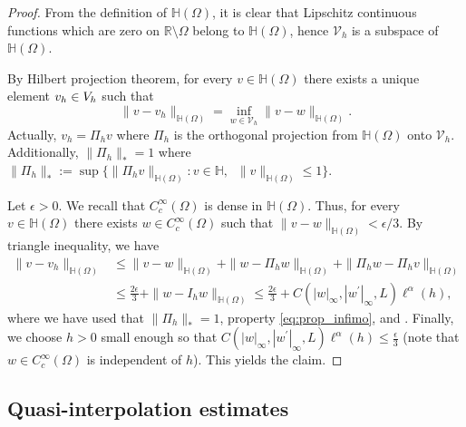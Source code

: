 \documentclass[11 pt]{article}
\numberwithin{equation}{section}
\def\R{\mathbb{R}}
\begin{document}
\begin{proof}
%
From the definition of $\mathbb H(\Omega)$, it is clear that Lipschitz continuous functions which are zero on $\R\setminus \Omega$ belong to $\mathbb H(\Omega)$, hence $\mathcal V_h$ is a subspace of $\mathbb H(\Omega)$.

By Hilbert projection theorem, for every $v\in\mathbb H(\Omega)$ there exists a unique element $v_h\in\mathcal \mathcal V_h$ such that
%
\begin{equation}\label{eq:prop_infimo}
    \|v-v_h\|_{\mathbb H(\Omega)}=\inf_{w\in\mathcal V_h}\|v-w\|_{\mathbb H(\Omega)}. 
\end{equation}
%
Actually, $v_h=\Pi_h v$ where $\Pi_h$ is the orthogonal projection from $\mathbb H(\Omega)$ onto $\mathcal V_h$. Additionally, $\|\Pi_h\|_*=1$ where $\|\Pi_h\|_*:=\sup\{\|\Pi_hv\|_{\mathbb H(\Omega)}: v\in\mathbb{H},\;\; \|v\|_{\mathbb H(\Omega)}\leq 1\}$.

Let $\epsilon>0$. We recall that $C_c^\infty(\Omega)$ is dense in $\mathbb H(\Omega)$. Thus, for every $v\in\mathbb H(\Omega)$ there exists $w\in C_c^\infty(\Omega)$ such that  $
    \|v-w\|_{\mathbb H(\Omega)}<\epsilon/3.$ By triangle inequality, we have
%
\begin{align*}
    \|v-v_h\|_{\mathbb H(\Omega)}&\leq \|v-w\|_{\mathbb H(\Omega)}+\|w-\Pi_h w\|_{\mathbb H(\Omega)}+\|\Pi_h w-\Pi_h v\|_{\mathbb H(\Omega)} \\
    &\leq \frac{2\epsilon}{3}+\|w-I_hw\|_{\mathbb H(\Omega)} \leq \frac{2\epsilon}{3}+{C(|w|_{\infty},|w^\prime|_{\infty},L)}\ell^\alpha(h),
\end{align*}
%
where we have used that $\|\Pi_h\|_*=1$, property \eqref{eq:prop_infimo}, and . {Finally, we choose $h>0$ small enough so that ${C(|w|_{\infty},|w^\prime|_{\infty},L)}\ell^\alpha(h)\leq \frac{\epsilon}{3}$ (note that $w\in C^\infty_c(\Omega)$ is independent of $h$)}. This yields the claim.
\end{proof}


\subsection{Quasi-interpolation estimates}\label{sec:estimates}
\end{document}

